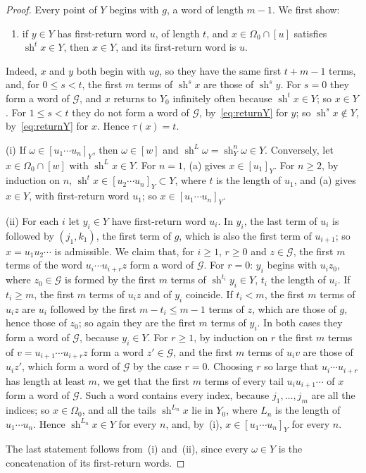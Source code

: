\documentclass[11pt]{amsart}
\theoremstyle{definition}
\theoremstyle{remark}
\begin{document}
\begin{proof}
Every point of $Y$ begins with $g$, a word of length $m-1$. We first show:
\begin{enumerate}
\item[(a)] if $y\in Y$ has first-return word $u$, of length $t$, and $x\in\Omega_0\cap[u]$ satisfies $\operatorname{sh}^tx\in Y$, then $x\in Y$, and its first-return word is $u$.
\end{enumerate}
Indeed, $x$ and $y$ both begin with $ug$, so they have the same first $t+m-1$ terms, and, for $0\le s<t$, the first $m$ terms of $\operatorname{sh}^sx$ are those of $\operatorname{sh}^sy$. For $s=0$ they form a word of $\mathcal G$, and $x$ returns to $Y_0$ infinitely often because $\operatorname{sh}^tx\in Y$; so $x\in Y$. For $1\le s<t$ they do not form a word of $\mathcal G$, by~\eqref{eq:returnY} for $y$; so $\operatorname{sh}^sx\notin Y$, by~\eqref{eq:returnY} for $x$. Hence $\tau(x)=t$.

(i) If $\omega\in[u_1\cdots u_n]_Y$, then $\omega\in[w]$ and $\operatorname{sh}^L\omega=\operatorname{sh}_Y^n\omega\in Y$. Conversely, let $x\in\Omega_0\cap[w]$ with $\operatorname{sh}^Lx\in Y$. For $n=1$, (a) gives $x\in[u_1]_Y$. For $n\ge2$, by induction on $n$, $\operatorname{sh}^{t}x\in[u_2\cdots u_n]_Y\subset Y$, where $t$ is the length of $u_1$, and (a) gives $x\in Y$, with first-return word $u_1$; so $x\in[u_1\cdots u_n]_Y$.

(ii) For each $i$ let $y_i\in Y$ have first-return word $u_i$. In $y_i$, the last term of $u_i$ is followed by $(j_1,k_1)$, the first term of $g$, which is also the first term of $u_{i+1}$; so $x=u_1u_2\cdots$ is admissible. We claim that, for $i\ge1$, $r\ge0$ and $z\in\mathcal G$, the first $m$ terms of the word $u_i\cdots u_{i+r}z$ form a word of $\mathcal G$. For $r=0$: $y_i$ begins with $u_iz_0$, where $z_0\in\mathcal G$ is formed by the first $m$ terms of $\operatorname{sh}^{t_i}y_i\in Y$, $t_i$ the length of $u_i$. If $t_i\ge m$, the first $m$ terms of $u_iz$ and of $y_i$ coincide. If $t_i<m$, the first $m$ terms of $u_iz$ are $u_i$ followed by the first $m-t_i\le m-1$ terms of $z$, which are those of $g$, hence those of $z_0$; so again they are the first $m$ terms of $y_i$. In both cases they form a word of $\mathcal G$, because $y_i\in Y$. For $r\ge1$, by induction on $r$ the first $m$ terms of $v=u_{i+1}\cdots u_{i+r}z$ form a word $z'\in\mathcal G$, and the first $m$ terms of $u_iv$ are those of $u_iz'$, which form a word of $\mathcal G$ by the case $r=0$. Choosing $r$ so large that $u_i\cdots u_{i+r}$ has length at least $m$, we get that the first $m$ terms of every tail $u_iu_{i+1}\cdots$ of $x$ form a word of $\mathcal G$. Such a word contains every index, because $j_1,\dots,j_m$ are all the indices; so $x\in\Omega_0$, and all the tails $\operatorname{sh}^{L_n}x$ lie in $Y_0$, where $L_n$ is the length of $u_1\cdots u_n$. Hence $\operatorname{sh}^{L_n}x\in Y$ for every $n$, and, by~(i), $x\in[u_1\cdots u_n]_Y$ for every $n$.

The last statement follows from~(i) and~(ii), since every $\omega\in Y$ is the concatenation of its first-return words.
\end{proof}
\end{document}
